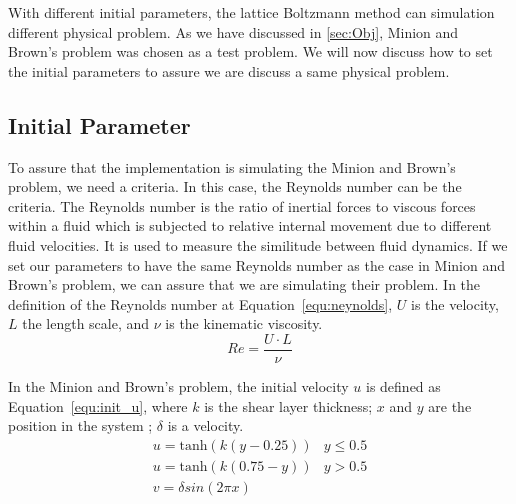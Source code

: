 With different initial parameters, the lattice Boltzmann method can simulation different physical problem. As we have discussed in \ref{sec:Obj}, Minion and Brown's problem\cite{minion1997performance} was chosen as a test problem. We will now discuss how to set the initial parameters to assure we are discuss a same physical problem.\\


\subsection{Initial Parameter}
To assure that the implementation is simulating the Minion and Brown's problem\cite{minion1997performance}, we need a criteria. In this case, the Reynolds number can be the criteria. The Reynolds number is the ratio of inertial forces to viscous forces within a fluid which is subjected to relative internal movement due to different fluid velocities\cite{munson2013fluid}. It is used to measure the similitude between fluid dynamics. If we set our parameters to have the same Reynolds number as the case in Minion and Brown's problem, we can assure that we are simulating their problem. In the definition of the Reynolds number at Equation~\ref{equ:neynolds}, $U$ is the velocity, $L$ the length scale, and $\nu$ is the kinematic viscosity.\\
\begin{equation}
\label{equ:neynolds}
    Re = \frac{U \cdot L}{\nu}
\end{equation}

In the Minion and Brown's problem, the initial velocity $u$ is defined as Equation~\ref{equ:init_u}, where $k$ is the shear layer thickness; $x$ and $y$ are the position in the system ; $\delta$ is a velocity. \\

\begin{equation}
\label{equ:init_u}
    \begin{matrix}
    
u = \mathrm{tanh}(k (y-0.25)) & y \leqslant 0.5 \\ 
u = \mathrm{tanh}(k (0.75-y)) & y > 0.5  \\
v = \delta sin(2\pi x )
\end{matrix}
\end{equation}

